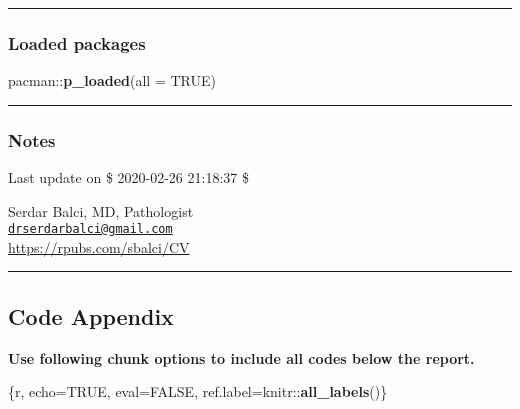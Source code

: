 \documentclass[
]{article}
\newenvironment{Shaded}{\begin{snugshade}}{\end{snugshade}}
\newcommand{\DataTypeTok}[1]{\textcolor[rgb]{0.00,0.34,0.68}{#1}}
\newcommand{\KeywordTok}[1]{\textcolor[rgb]{0.12,0.11,0.11}{\textbf{#1}}}
\newcommand{\NormalTok}[1]{\textcolor[rgb]{0.12,0.11,0.11}{#1}}
\newcommand{\OperatorTok}[1]{\textcolor[rgb]{0.12,0.11,0.11}{#1}}
\newcommand{\OtherTok}[1]{\textcolor[rgb]{0.00,0.43,0.16}{#1}}
\begin{document}
\pagebreak

\begin{center}\rule{0.5\linewidth}{0.5pt}\end{center}

\hypertarget{loaded-packages}{%
\subsubsection{Loaded packages}\label{loaded-packages}}

\begin{Shaded}
\begin{Highlighting}[]
\NormalTok{pacman}\OperatorTok{::}\KeywordTok{p_loaded}\NormalTok{(}\DataTypeTok{all =} \OtherTok{TRUE}\NormalTok{)}
\end{Highlighting}
\end{Shaded}

\begin{center}\rule{0.5\linewidth}{0.5pt}\end{center}

\pagebreak

\hypertarget{notes}{%
\subsubsection{Notes}\label{notes}}

Last update on \$ 2020-02-26 21:18:37 \$

Serdar Balci, MD, Pathologist\\
\href{mailto:drserdarbalci@gmail.com}{\nolinkurl{drserdarbalci@gmail.com}}\\
\url{https://rpubs.com/sbalci/CV}

\begin{center}\rule{0.5\linewidth}{0.5pt}\end{center}

\pagebreak

\hypertarget{code-appendix}{%
\subsection{Code Appendix}\label{code-appendix}}

\textbf{Use following chunk options to include all codes below the
report.}

\begin{Shaded}
\begin{Highlighting}[]
\NormalTok{\{r, echo=}\OtherTok{TRUE}\NormalTok{, eval=}\OtherTok{FALSE}\NormalTok{, ref.label=knitr}\OperatorTok{::}\KeywordTok{all_labels}\NormalTok{()\}}
\end{Highlighting}
\end{Shaded}
\end{document}
